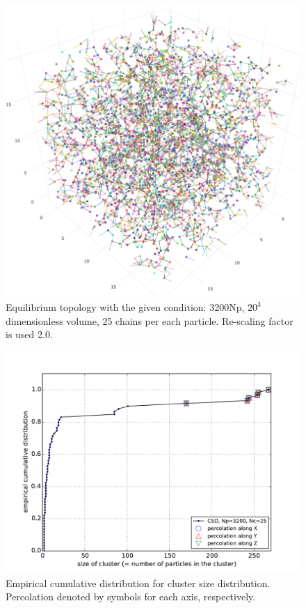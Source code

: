 \documentclass[10pt, a4paper]{article}
\begin{document}
\begin{appendices}
\begin{figure}
\centering
\includegraphics[width=.9\linewidth]{../data_structure/ex_3d_NP3200_SF20_percolation.png}
\caption{
  Equilibrium topology with the given condition: 3200Np, \(20^3\) dimensionless volume, 25 chains per each particle. Re-scaling factor is used 2.0.}
\label{fig:orgparagraph2}
\end{figure}

\begin{figure}
\centering
\includegraphics[width=.9\linewidth]{figures/test_percolation.pdf}
\caption{Empirical cumulative distribution for cluster size distribution. Percolation denoted by symbols for each axis, respectively.}
\label{fig:orgparagraph3}
\end{figure}




\end{appendices}
\end{document}
